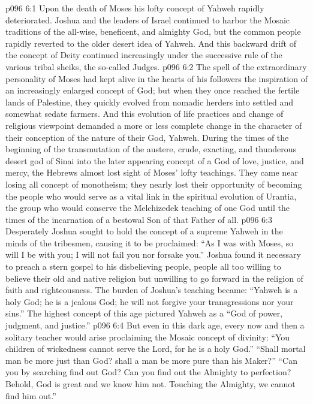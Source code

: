 \vs p096 6:1 Upon the death of Moses his lofty concept of Yahweh rapidly deteriorated. Joshua and the leaders of Israel continued to harbor the Mosaic traditions of the all\hyp{}wise, beneficent, and almighty God, but the common people rapidly reverted to the older desert idea of Yahweh. And this backward drift of the concept of Deity continued increasingly under the successive rule of the various tribal sheiks, the so\hyp{}called Judges.
\vs p096 6:2 The spell of the extraordinary personality of Moses had kept alive in the hearts of his followers the inspiration of an increasingly enlarged concept of God; but when they once reached the fertile lands of Palestine, they quickly evolved from nomadic herders into settled and somewhat sedate farmers. And this evolution of life practices and change of religious viewpoint demanded a more or less complete change in the character of their conception of the nature of their God, Yahweh. During the times of the beginning of the transmutation of the austere, crude, exacting, and thunderous desert god of Sinai into the later appearing concept of a God of love, justice, and mercy, the Hebrews almost lost sight of Moses’ lofty teachings. They came near losing all concept of monotheism; they nearly lost their opportunity of becoming the people who would serve as a vital link in the spiritual evolution of Urantia, the group who would conserve the Melchizedek teaching of one God until the times of the incarnation of a bestowal Son of that Father of all.
\vs p096 6:3 Desperately Joshua sought to hold the concept of a supreme Yahweh in the minds of the tribesmen, causing it to be proclaimed: “As I was with Moses, so will I be with you; I will not fail you nor forsake you.” Joshua found it necessary to preach a stern gospel to his disbelieving people, people all too willing to believe their old and native religion but unwilling to go forward in the religion of faith and righteousness. The burden of Joshua’s teaching became: “Yahweh is a holy God; he is a jealous God; he will not forgive your transgressions nor your sins.” The highest concept of this age pictured Yahweh as a “God of power, judgment, and justice.”
\vs p096 6:4 But even in this dark age, every now and then a solitary teacher would arise proclaiming the Mosaic concept of divinity: “You children of wickedness cannot serve the Lord, for he is a holy God.” “Shall mortal man be more just than God? shall a man be more pure than his Maker?” “Can you by searching find out God? Can you find out the Almighty to perfection? Behold, God is great and we know him not. Touching the Almighty, we cannot find him out.”
